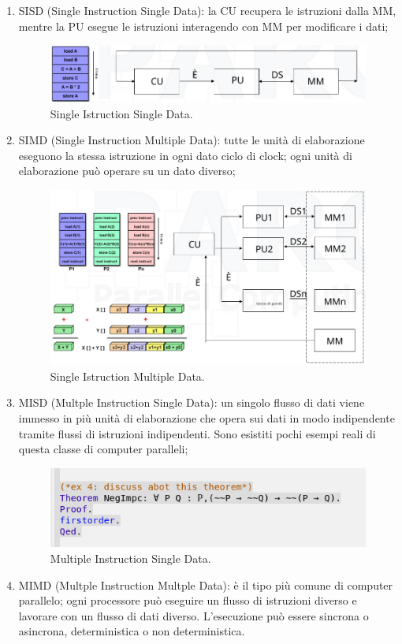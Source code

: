 \begin{enumerate}
	\item SISD (Single Instruction Single Data): la CU recupera le istruzioni dalla MM, mentre la PU esegue le istruzioni interagendo con MM per modificare i dati;
	\begin{figure}[th]
		\centering
		\includegraphics[width=0.7\linewidth]{img/sisd}
		\caption{Single Istruction Single Data.}
		\label{fig:sisd}
	\end{figure}
	\item SIMD (Single Instruction Multiple Data): tutte le unità di elaborazione eseguono la stessa istruzione in ogni dato ciclo di clock; ogni unità di elaborazione può operare su un dato diverso;
	\begin{figure}[th]
		\centering
		\includegraphics[width=0.7\linewidth]{img/simd}
		\caption{Single Istruction Multiple Data.}
		\label{fig:simd}
	\end{figure}

	\item MISD (Multple Instruction Single Data): un singolo flusso di dati viene immesso in più unità di elaborazione che opera sui dati in modo indipendente tramite flussi di istruzioni indipendenti. Sono esistiti pochi esempi reali di questa classe di computer paralleli;
	\begin{figure}[th]
		\centering
		\includegraphics[width=0.7\linewidth]{img/misd}
		\caption{Multiple Instruction Single Data.}
		\label{fig:misd}
	\end{figure}

	\item MIMD (Multple Instruction Multple Data): è il tipo più comune di computer parallelo; ogni processore può eseguire un flusso di istruzioni diverso e lavorare con un flusso di dati diverso. L'esecuzione può essere sincrona o asincrona, deterministica o non deterministica.
\end{enumerate}

